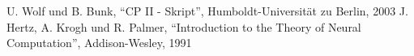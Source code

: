 \documentclass[12pt,a4paper]{article}
\begin{document}




\newpage
\begin{thebibliography}{}

     U. Wolf und B. Bunk, "`CP II - Skript"', Humboldt-Universität zu Berlin, 2003
     J. Hertz, A. Krogh und R. Palmer, "`Introduction to the Theory of Neural Computation"',  Addison-Wesley, 1991
\end{thebibliography}
\end{document}
